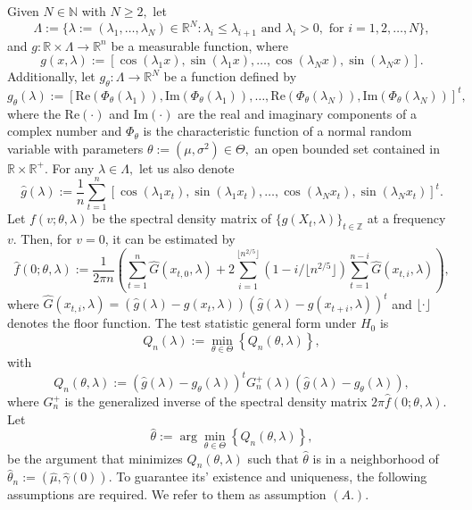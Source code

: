 Given \(N \in\mathbb{N}\) with \(N \geq 2,\) let
\[
\Lambda :=\{\lambda:=(\lambda_1, \ldots, \lambda_N) \in \mathbb{R}^N: \lambda_i \leq \lambda_{i+1} \text{ and } \lambda_i > 0, \text{ for }  i = 1,2,\ldots, N \},
\]
and \(g:\mathbb{R}\times \Lambda \rightarrow \mathbb{R}^n\) be a measurable function, where
\[
 g(x,\lambda):= [\cos(\lambda_1x),\sin(\lambda_1x),\ldots,\cos(\lambda_Nx),\sin(\lambda_Nx)].
\]
Additionally, let \(g_\theta:\Lambda \rightarrow \mathbb{R}^N\) be a function defined by
\[
 g_\theta(\lambda) := \left[\mbox{Re}(\Phi_\theta(\lambda_1)),\mbox{Im}(\Phi_\theta(\lambda_1)),\ldots,\mbox{Re}(\Phi_\theta(\lambda_N)),\mbox{Im}(\Phi_\theta(\lambda_N))  \right]^t,
\]
where the \(\mbox{Re}(\cdot)\) and \(\mbox{Im}(\cdot)\) are the real and imaginary components of a complex number and \(\Phi_\theta\) is the characteristic function of a normal random variable with parameters \(\theta := (\mu,\sigma^2)\in \Theta,\) an open bounded set contained in \(\mathbb{R}\times \mathbb{R}^+\). For any \(\lambda\in\Lambda,\) let us also denote
\[
 \widehat{g}(\lambda) := \dfrac{1}{n}\sum_{t=1}^n [\cos(\lambda_1 x_t),\sin(\lambda_1x_t),\ldots,\cos(\lambda_N x_t),\sin(\lambda_N x_t)]^t.
\]
Let \(f(v;\theta,\lambda)\) be the spectral density matrix of \(\{g(X_t,\lambda)\}_{t \in\mathbb{Z}}\) at a frequency \(v.\)
Then, for \(v = 0\), it can be estimated by
\[
 \widehat{f}(0;\theta,\lambda) := \dfrac{1}{2\pi n}\left(\sum_{t=1}^n  \widehat{G}(x_{t,0},\lambda) +2\sum_{i=1}^{\lfloor  n^{2/5}\rfloor}(1 -i/\lfloor n^{2/5}  \rfloor)\sum_{t=1}^{n-i}\widehat{G}(x_{t,i},\lambda) \right),
\]
where \(\widehat{G}(x_{t,i},\lambda) = (\widehat{g}(\lambda) -g(x_{t},\lambda))(\widehat{g}(\lambda) -g(x_{t+i},\lambda))^t\) and \(\lfloor \cdot \rfloor\) denotes the floor function. The test statistic general form under \(H_0\) is
\[
 Q_n(\lambda) := \min_{\theta \in \Theta} \left\{ Q_n(\theta,\lambda) \right\},
\]
with
\[
 Q_n(\theta,\lambda):=(\widehat{g}(\lambda)-g_\theta(\lambda))^tG_n^+(\lambda)(\widehat{g}(\lambda)-g_\theta(\lambda)),
\]
where \(G^{+}_n\) is the generalized inverse of the spectral density matrix \(2 \pi \widehat{f}(0;\theta,\lambda)\). Let
\[
 \widehat{\theta} := \arg \min_{\theta \in \Theta} \left\{ Q_n(\theta,\lambda) \right\},
\]
be the argument that minimizes \(Q_n(\theta,\lambda)\) such that \(\widehat{\theta}\) is in a neighborhood of \(\widehat{\theta}_n := (\widehat{\mu},\widehat{\gamma}(0))\). To guarantee its' existence and uniqueness, the following assumptions are required. We refer to them as assumption \((A.)\).

